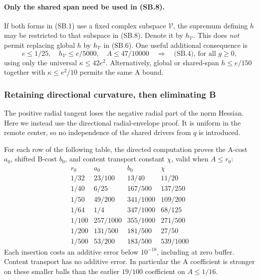 \paragraph{Only the shared span need be used in (SB.8).}
If both forms in (SB.1) use a fixed complex subspace \(\mathcal V\),
the supremum defining \(h\) may be restricted to that subspace in
(SB.8). Denote it by \(h_{\mathcal V}\).
This does \emph{not} permit replacing global \(h\) by \(h_{\mathcal V}\)
in (SB.6). One useful additional consequence is
\[
 e\le1/25,\quad h_{\mathcal V}\le e/5000,\quad A\le47/10000
 \quad\Longrightarrow\quad\text{(SB.4), for all }g\ge0,
 \tag{SB.9}
\]
using only the universal \(\kappa\le42e^2\).
Alternatively, global or shared-span \(h\le e/150\) together with
\(\kappa\le e^2/10\) permits the same A bound.

\subsubsection{Retaining directional curvature, then eliminating B}
\label{sec:sbt-costs}
The positive radial tangent loses the negative radial part of the norm
Hessian. Here we instead use the directional radial-envelope proof.
It is uniform in the remote center, so no independence of the shared
drivers from \(q\) is introduced.

For each row of the following table, the directed computation proves
the A-cost \(a_0\), shifted B-cost \(b_0\), and content transport
constant \(\chi\), valid when \(A\le r_0\):
\[
\begin{array}{c|c|c|c}
r_0&a_0&b_0&\chi\\ \hline
1/32&23/100&13/40&11/20\\
1/40&6/25&167/500&137/250\\
1/50&49/200&341/1000&109/200\\
1/64&1/4&347/1000&68/125\\
1/100&257/1000&355/1000&271/500\\
1/200&131/500&181/500&27/50\\
1/500&53/200&183/500&539/1000
\end{array}
\tag{SB.10}
\]
Each insertion costs an additive error below \(10^{-18}\), including
at zero buffer. Content transport has no additive error.
In particular the A coefficient is stronger on these smaller balls
than the earlier \(19/100\) coefficient on \(A\le1/16\).

